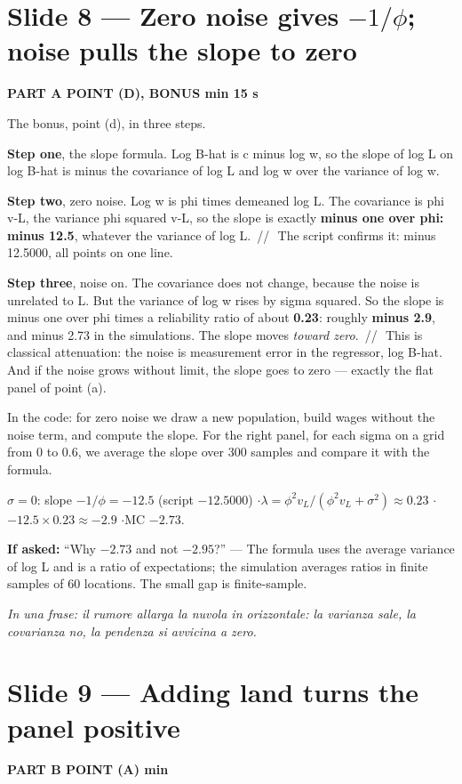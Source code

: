 \documentclass[11pt,a4paper]{article}
\newcommand{\slide}[3]{\Needspace{14\baselineskip}\section{#1}\textcolor{unicared}{\small\bfseries\MakeUppercase{#3}\quad\textperiodcentered\quad #2}\par}
\newcommand{\idea}[1]{\par{\small\itshape\color{unicablue}In una frase: #1}\par}
\newcommand{\pause}{\textcolor{unicared}{\,/\!/\,}}
\begin{document}
\slide{Slide 8 --- Zero noise gives $-1/\phi$; noise pulls the slope to zero}{1 min 15 s}{Part A \textperiodcentered{} point (d), bonus}

\begin{say}
The bonus, point (d), in three steps.

\textbf{Step one}, the slope formula. Log B-hat is c minus log w, so the slope of log L on log B-hat is minus the covariance of log L and log w over the variance of log w.

\textbf{Step two}, zero noise. Log w is phi times demeaned log L. The covariance is phi v-L, the variance phi squared v-L, so the slope is exactly \textbf{minus one over phi: minus 12.5}, whatever the variance of log L. \pause\ The script confirms it: minus 12.5000, all points on one line.

\textbf{Step three}, noise on. The covariance does not change, because the noise is unrelated to L. But the variance of log w rises by sigma squared. So the slope is minus one over phi times a reliability ratio of about \textbf{0.23}: roughly \textbf{minus 2.9}, and minus 2.73 in the simulations. The slope moves \emph{toward zero}. \pause\ This is classical attenuation: the noise is measurement error in the regressor, log B-hat. And if the noise grows without limit, the slope goes to zero --- exactly the flat panel of point (a).

In the code: for zero noise we draw a new population, build wages without the noise term, and compute the slope. For the right panel, for each sigma on a grid from 0 to 0.6, we average the slope over 300 samples and compare it with the formula.
\end{say}

\begin{nums}
$\sigma = 0$: slope $-1/\phi = -12.5$ (script $-12.5000$) \quad$\cdot$\quad $\lambda = \phi^2 v_L/(\phi^2 v_L+\sigma^2) \approx 0.23$ \quad$\cdot$\quad $-12.5\times0.23 \approx -2.9$ \quad$\cdot$\quad MC $-2.73$.
\end{nums}
\begin{ask}
\textbf{If asked:} ``Why $-2.73$ and not $-2.95$?'' --- The formula uses the average variance of log L and is a ratio of expectations; the simulation averages ratios in finite samples of 60 locations. The small gap is finite-sample.
\end{ask}
\idea{il rumore allarga la nuvola in orizzontale: la varianza sale, la covarianza no, la pendenza si avvicina a zero.}
\slide{Slide 9 --- Adding land turns the panel positive}{1 min}{Part B \textperiodcentered{} point (a)}
\end{document}

